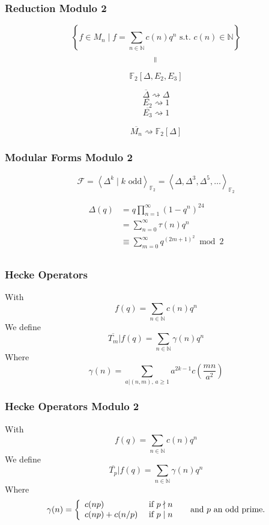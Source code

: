 \documentclass[12pt]{beamer}
\begin{document}
	\begin{frame}
		\frametitle{Reduction Modulo 2}
		$$\left\lbrace f \in M_n \mid f = \sum_{n \in \mathbb{N}} c(n)q^n \text{ s.t. } c(n) \in \mathbb{N} \right\rbrace$$
		$$\rotatebox{90}{$=$}$$
		$$\mathbb{F}_2\left[ \Delta, E_2, E_3 \right]$$
		
		$$\overline{\Delta} \rightsquigarrow \Delta$$
		$$\overline{E_2} \rightsquigarrow 1$$
		$$\overline{E_3} \rightsquigarrow 1$$
		
		$$\overline{M_n} \rightsquigarrow \mathbb{F}_2 \left[ \Delta \right]$$
	\end{frame}

	\begin{frame}
		\frametitle{Modular Forms Modulo 2}
		$$
		\mathcal{F}
		= \left\langle \Delta^k \mid k \text{ odd} \right\rangle_{\mathbb{F}_2}
		= \left\langle \Delta, \Delta^3, \Delta^5, \dots \right\rangle_{\mathbb{F}_2}
		$$
		
		\begin{align*}
			\Delta(q)
			&= q \prod_{n=1}^{\infty} (1-q^n)^{24}\\
			&= \sum_{n=0}^{\infty} \tau(n)q^n\\
			&\equiv \sum_{m=0}^{\infty} q^{(2m+1)^2} \bmod 2\\
		\end{align*}
	\end{frame}
	
	\begin{frame}
		\frametitle{Hecke Operators}
		With
		$$
		f(q) = \sum_{n \in \mathbb{N}} c(n)q^n
		$$
		We define
		$$
		\overline{T_m}|f(q) = \sum_{n \in \mathbb{N}} \gamma(n)q^n
		$$
		Where
		$$
		\gamma(n) = \sum_{a | (n,m),\, a \geq 1} a^{2k-1} c\left( \frac{mn}{a^2} \right)
		$$
	\end{frame}

	\begin{frame}
		\frametitle{Hecke Operators Modulo 2}
		With
		$$
		f(q) = \sum_{n \in \mathbb{N}} c(n)q^n
		$$
		We define
		$$
		\overline{T_p}|f(q) = \sum_{n \in \mathbb{N}} \gamma(n)q^n
		$$
		Where
		$$
		\gamma(n) = 
		\left\lbrace
		\begin{array}{l l}
		c(np)        & \text{ if } p \nmid n \\
		c(np)+c(n/p) & \text{ if } p \mid  n
		\end{array}
		\right. 
		\quad \text{ and } p \text{ an odd prime}.
		$$
	\end{frame}
\end{document}
